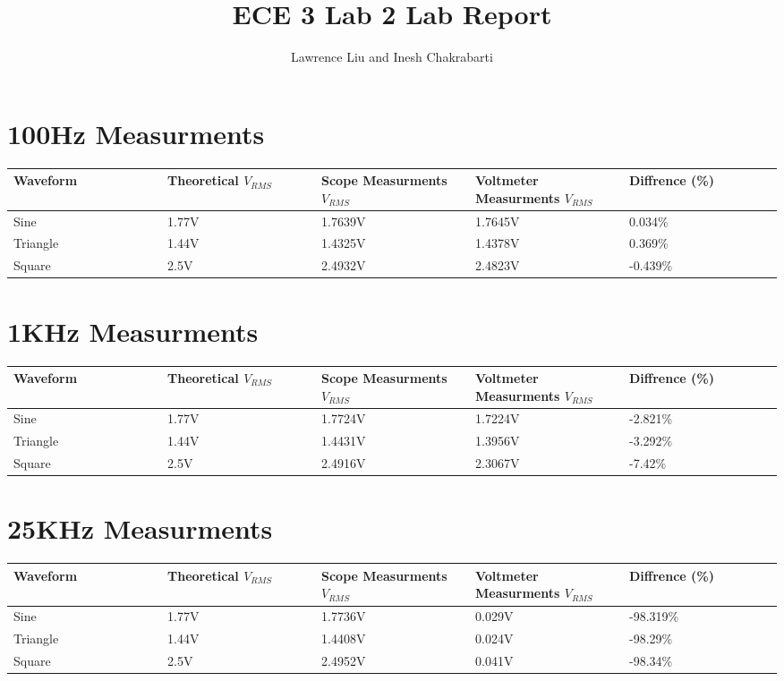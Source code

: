 \documentclass[12pt]{article}
\title{ECE 3 Lab 2 Lab Report}
\author{Lawrence Liu and Inesh Chakrabarti}
\begin{document}
\maketitle
\section*{100Hz Measurments}
\begin{center}
    \begin{tabular}{|p{0.2\linewidth} | p{0.2\linewidth} |p{0.2\linewidth} |p{0.2\linewidth} |p{0.2\linewidth} |} 
     \hline
     Waveform & Theoretical $V_{RMS}$ & Scope Measurments $V_{RMS}$ & Voltmeter Measurments $V_{RMS}$& Diffrence (\%) \\ [0.5ex] 
     \hline\hline
     Sine & 1.77V & 1.7639V & 1.7645V &  0.034\%\\
     \hline
     Triangle & 1.44V & 1.4325V & 1.4378V & 0.369\%\\
     \hline
     Square & 2.5V & 2.4932V & 2.4823V & -0.439\%\\ 
     \hline
    \end{tabular}
\end{center}
\section*{1KHz Measurments}
\begin{center}
    \begin{tabular}{|p{0.2\linewidth} | p{0.2\linewidth} |p{0.2\linewidth} |p{0.2\linewidth} |p{0.2\linewidth} |} 
     \hline
     Waveform & Theoretical $V_{RMS}$ & Scope Measurments $V_{RMS}$ & Voltmeter Measurments $V_{RMS}$& Diffrence (\%) \\ [0.5ex] 
     \hline\hline
     Sine & 1.77V & 1.7724V & 1.7224V &  -2.821\%\\
     \hline
     Triangle & 1.44V & 1.4431V & 1.3956V & -3.292\%\\
     \hline
     Square & 2.5V & 2.4916V & 2.3067V & -7.42\%\\ 
     \hline
    \end{tabular}
\end{center}
\section*{25KHz Measurments}
\begin{center}
    \begin{tabular}{|p{0.2\linewidth} | p{0.2\linewidth} |p{0.2\linewidth} |p{0.2\linewidth} |p{0.2\linewidth} |} 
     \hline
     Waveform & Theoretical $V_{RMS}$ & Scope Measurments $V_{RMS}$ & Voltmeter Measurments $V_{RMS}$& Diffrence (\%) \\ [0.5ex] 
     \hline\hline
     Sine & 1.77V & 1.7736V & 0.029V &  -98.319\%\\
     \hline
     Triangle & 1.44V & 1.4408V & 0.024V & -98.29\%\\
     \hline
     Square & 2.5V & 2.4952V & 0.041V & -98.34\%\\ 
     \hline
    \end{tabular}
\end{center}
\end{document}
